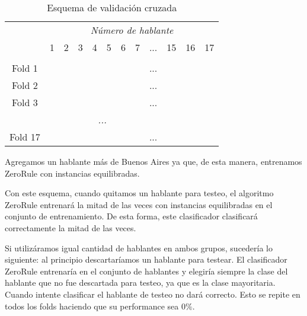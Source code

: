 \begin{table}[H]
	\centering
	\begin{tabular}{cccccccccccc}
		& \multicolumn{11}{c}{\textit{Número de hablante}} \\
		& 1 & 2 & 3 & 4 & 5 & 6 & 7 & ... & 15 & 16 & 17 \\
		\hline \\
		Fold 1 &\mycirc[red] & \mycirc[blue] & \mycirc[blue]  & \mycirc[blue]  & \mycirc[blue]  & \mycirc[blue]  & \mycirc[blue] & ... & \mycirc[blue] & \mycirc[blue] & \mycirc[blue]  \\
		
		Fold 2 &\mycirc[blue] & \mycirc[red] & \mycirc[blue]  & \mycirc[blue]  & \mycirc[blue]  & \mycirc[blue]  & \mycirc[blue] & ... & \mycirc[blue] & \mycirc[blue] & \mycirc[blue]  \\
		
		Fold 3 &\mycirc[blue] & \mycirc[blue] & \mycirc[red]  & \mycirc[blue]  & \mycirc[blue]  & \mycirc[blue]  & \mycirc[blue] & ... & \mycirc[blue] & \mycirc[blue] & \mycirc[blue]  \\
		
		\multicolumn{11}{c}{\textit{...}}	\\
		
		Fold 17 &\mycirc[blue] & \mycirc[blue] & \mycirc[blue]  & \mycirc[blue]  & \mycirc[blue]  & \mycirc[blue]  & \mycirc[blue] & ... & \mycirc[blue] & \mycirc[blue] & \mycirc[red]   \\
		
	\end{tabular}
	\caption{Esquema de validación cruzada}
	\label{PAH_esq_cv}
\end{table}

Agregamos un hablante más de Buenos Aires ya que, de esta manera, entrenamos ZeroRule con instancias equilibradas. 

Con este esquema, cuando quitamos un hablante para testeo, el algoritmo ZeroRule entrenará la mitad de las veces con instancias equilibradas en el conjunto de entrenamiento. De esta forma, este clasificador clasificará correctamente la mitad de las veces.

Si utilizáramos igual cantidad de hablantes en ambos grupos, sucedería lo siguiente: al principio  descartaríamos un hablante para testear. El clasificador ZeroRule entrenaría en el conjunto de hablantes y elegiría siempre la clase del hablante que no fue descartada para testeo, ya que es la clase mayoritaria. Cuando intente clasificar el hablante de testeo no dará correcto. Esto se repite en todos los folds haciendo que su performance sea $0\%$.

